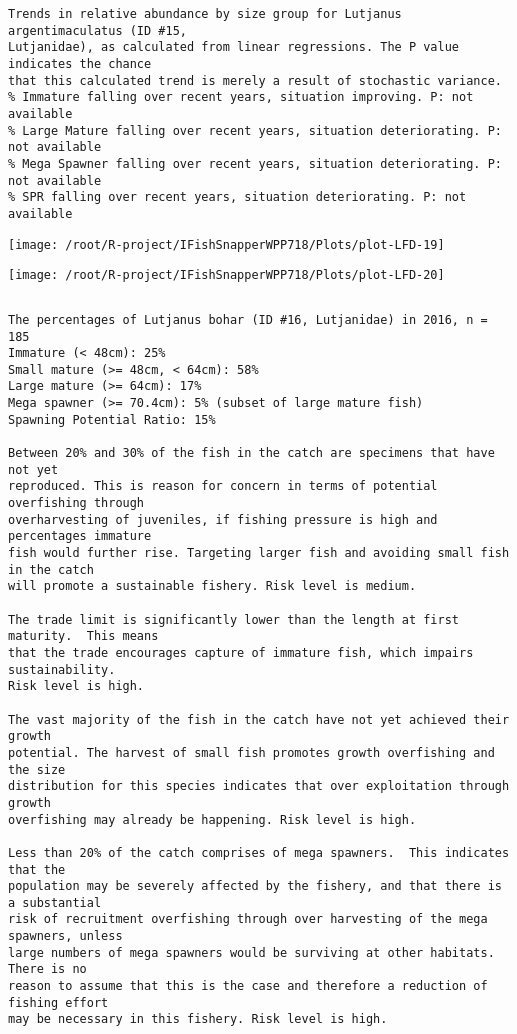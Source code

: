 \documentclass{report}\usepackage[]{graphicx}\usepackage[]{color}
\makeatletter
\def\maxwidth{ %
  \ifdim\Gin@nat@width>\linewidth
    \linewidth
  \else
    \Gin@nat@width
  \fi
}
\newenvironment{kframe}{%
 \def\at@end@of@kframe{}%
 \ifinner\ifhmode%
  \def\at@end@of@kframe{\end{minipage}}%
  \begin{minipage}{\columnwidth}%
 \fi\fi%
 \def\FrameCommand##1{\hskip\@totalleftmargin \hskip-\fboxsep
 \colorbox{shadecolor}{##1}\hskip-\fboxsep
     \hskip-\linewidth \hskip-\@totalleftmargin \hskip\columnwidth}%
 \MakeFramed {\advance\hsize-\width
   \@totalleftmargin\z@ \linewidth\hsize
   \@setminipage}}%
 {\par\unskip\endMakeFramed%
 \at@end@of@kframe}
\newenvironment{knitrout}{}{} %
\makeatother
\begin{document}
\begin{knitrout}
\begin{kframe}
\begin{verbatim}
Trends in relative abundance by size group for Lutjanus argentimaculatus (ID #15,
Lutjanidae), as calculated from linear regressions. The P value indicates the chance
that this calculated trend is merely a result of stochastic variance.
% Immature falling over recent years, situation improving. P: not available
% Large Mature falling over recent years, situation deteriorating. P: not available
% Mega Spawner falling over recent years, situation deteriorating. P: not available
% SPR falling over recent years, situation deteriorating. P: not available
\end{verbatim}
\end{kframe}
\texttt{[image: /root/R-project/IFishSnapperWPP718/Plots/plot-LFD-19]} 

\texttt{[image: /root/R-project/IFishSnapperWPP718/Plots/plot-LFD-20]} 
\begin{kframe}\begin{verbatim}
\end{verbatim}
\end{kframe}
\clearpage
\newpage
\begin{kframe}\begin{verbatim}The percentages of Lutjanus bohar (ID #16, Lutjanidae) in 2016, n = 185
Immature (< 48cm): 25%
Small mature (>= 48cm, < 64cm): 58%
Large mature (>= 64cm): 17%
Mega spawner (>= 70.4cm): 5% (subset of large mature fish)
Spawning Potential Ratio: 15%
 
Between 20% and 30% of the fish in the catch are specimens that have not yet
reproduced. This is reason for concern in terms of potential overfishing through
overharvesting of juveniles, if fishing pressure is high and percentages immature
fish would further rise. Targeting larger fish and avoiding small fish in the catch
will promote a sustainable fishery. Risk level is medium.

The trade limit is significantly lower than the length at first maturity.  This means
that the trade encourages capture of immature fish, which impairs sustainability.
Risk level is high.

The vast majority of the fish in the catch have not yet achieved their growth
potential. The harvest of small fish promotes growth overfishing and the size
distribution for this species indicates that over exploitation through growth
overfishing may already be happening. Risk level is high.

Less than 20% of the catch comprises of mega spawners.  This indicates that the
population may be severely affected by the fishery, and that there is a substantial
risk of recruitment overfishing through over harvesting of the mega spawners, unless
large numbers of mega spawners would be surviving at other habitats. There is no
reason to assume that this is the case and therefore a reduction of fishing effort
may be necessary in this fishery. Risk level is high.
 

\end{verbatim}
\end{kframe}
\end{knitrout}
\end{document}
